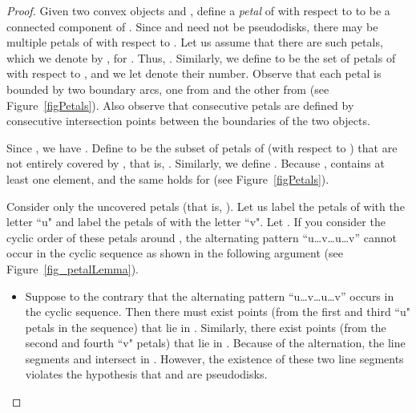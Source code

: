 \documentclass[a4paper,11pt]{article}
\begin{document}
\begin{proof}

Given two convex   objects  and , define a \emph{petal} of  with respect to  to be a connected component of . 
Since  and  need not be pseudodisks, there may be multiple petals of  with respect to . 
Let us assume that there are  such petals, which we denote by , for . 
Thus, . Similarly, we define  to be the set of petals of  with respect to  , and we let  denote their number.
Observe that each petal is bounded by two boundary arcs, one from  and the other from
 (see Figure~\ref{figPetals}). Also observe that consecutive petals are defined by consecutive intersection points between the boundaries of the two objects. 



Since , we have  .
Define  to be the subset of petals of  (with respect to ) that are not entirely covered by , that is, .
Similarly, we define  . 
Because ,  contains at least one element, and the same holds for  (see Figure~\ref{figPetals}). 




Consider only the uncovered petals (that is, ). Let us label the
petals of  with the letter ``u" and label the petals of  with the letter
``v".  Let . If you consider the cyclic order of these petals around , 
the alternating pattern ``u\dots v\dots u\dots v” cannot occur in the cyclic sequence as shown in the following argument (see Figure~\ref{fig_petalLemma}).

\begin{itemize}
    \item[] 
Suppose to the contrary that the alternating pattern ``u\dots v\dots u\dots v” occurs in the cyclic sequence. Then there must exist points  (from the first and third ``u" petals in the sequence) that lie
in . Similarly, there exist points  (from the second and fourth ``v" petals) that lie in . 
  Because of the alternation, the line segments
  and  intersect in . 
However, the existence of these two line segments violates the hypothesis that  and  are pseudodisks.
\end{itemize}


\end{proof}
\end{document}

